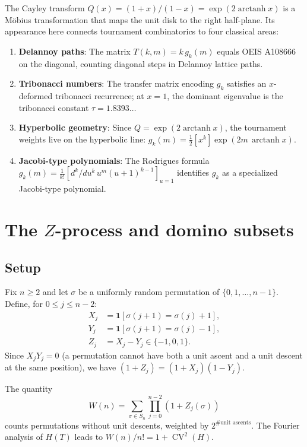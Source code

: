 \documentclass[11pt]{amsart}
\theoremstyle{definition}
\DeclareMathOperator{\CV}{CV}
\DeclareMathOperator{\arctanh}{arctanh}
\begin{document}
The Cayley transform $Q(x) = (1+x)/(1-x) = \exp(2\arctanh x)$ is a M\"obius transformation that maps the unit disk to the right half-plane. Its appearance here connects tournament combinatorics to four classical areas:
\begin{enumerate}
\item \textbf{Delannoy paths}: The matrix $T(k,m) = k\, g_k(m)$ equals OEIS A108666 on the diagonal, counting diagonal steps in Delannoy lattice paths.
\item \textbf{Tribonacci numbers}: The transfer matrix encoding $g_k$ satisfies an $x$-deformed tribonacci recurrence; at $x=1$, the dominant eigenvalue is the tribonacci constant $\tau = 1.8393\ldots$
\item \textbf{Hyperbolic geometry}: Since $Q = \exp(2\arctanh x)$, the tournament weights live on the hyperbolic line: $g_k(m) = \tfrac{1}{2}[x^k]\exp(2m\,\arctanh x)$.
\item \textbf{Jacobi-type polynomials}: The Rodrigues formula $g_k(m) = \frac{1}{k!}[d^k/du^k\, u^m(u+1)^{k-1}]_{u=1}$ identifies $g_k$ as a specialized Jacobi-type polynomial.
\end{enumerate}

\section{The $Z$-process and domino subsets}

\subsection{Setup}

Fix $n \geq 2$ and let $\sigma$ be a uniformly random permutation of $\{0,1,\ldots,n-1\}$. Define, for $0 \leq j \leq n-2$:
\begin{align*}
X_j &= \mathbf{1}[\sigma(j+1) = \sigma(j)+1], \\
Y_j &= \mathbf{1}[\sigma(j+1) = \sigma(j)-1], \\
Z_j &= X_j - Y_j \in \{-1, 0, 1\}.
\end{align*}
Since $X_j Y_j = 0$ (a permutation cannot have both a unit ascent and a unit descent at the same position), we have $(1+Z_j) = (1+X_j)(1-Y_j)$.

The quantity
\[
W(n) = \sum_{\sigma \in S_n} \prod_{j=0}^{n-2}(1+Z_j(\sigma))
\]
counts permutations without unit descents, weighted by $2^{\text{\#unit ascents}}$. The Fourier analysis of $H(T)$ leads to $W(n)/n! = 1 + \CV^2(H)$.
\end{document}
